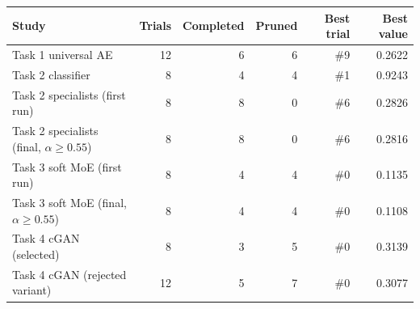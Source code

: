 \begin{tabular}{lrrrrr}
\toprule
Study & Trials & Completed & Pruned & Best trial & Best value \\
\midrule
Task 1 universal AE & 12 & 6 & 6 & \#9 & 0.2622 \\
Task 2 classifier & 8 & 4 & 4 & \#1 & 0.9243 \\
Task 2 specialists (first run) & 8 & 8 & 0 & \#6 & 0.2826 \\
Task 2 specialists (final, $\alpha\geq0.55$) & 8 & 8 & 0 & \#6 & 0.2816 \\
Task 3 soft MoE (first run) & 8 & 4 & 4 & \#0 & 0.1135 \\
Task 3 soft MoE (final, $\alpha\geq0.55$) & 8 & 4 & 4 & \#0 & 0.1108 \\
Task 4 cGAN (selected) & 8 & 3 & 5 & \#0 & 0.3139 \\
Task 4 cGAN (rejected variant) & 12 & 5 & 7 & \#0 & 0.3077 \\
\bottomrule
\end{tabular}
